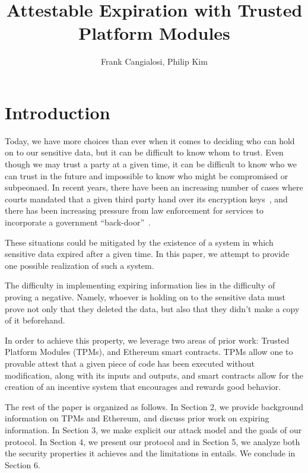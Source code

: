 \documentclass{article}
\begin{document}
\title{Attestable Expiration with Trusted Platform Modules}
\author{Frank Cangialosi, Philip Kim}

\maketitle

\section{Introduction}

Today, we have more choices than ever when it comes to deciding who can hold on to our sensitive data, but it can be difficult to know whom to trust. Even though we may trust a party at a given time, it can be difficult to know who we can trust in the future and impossible to know who might be compromised or subpeonaed. In recent years, there have been an increasing number of cases where courts mandated that a given third party hand over its encryption keys~\cite{hushmail}, and there has been increasing pressure from law enforcement for services to incorporate a government ``back-door''~\cite{backdoor}.

These situations could be mitigated by the existence of a system in which sensitive data expired after a given time. In this paper, we attempt to provide one possible realization of such a system.

The difficulty in implementing expiring information lies in the difficulty of proving a negative. Namely, whoever is holding on to the sensitive data must prove not only that they deleted the data, but also that they didn't make a copy of it beforehand.

In order to achieve this property, we leverage two areas of prior work: Trusted Platform Modules (TPMs), and Ethereum smart contracts. TPMs allow one to provable attest that a given piece of code has been executed without modification, along with its inputs and outputs, and smart contracts allow for the creation of an incentive system that encourages and rewards good behavior.

The rest of the paper is organized as follows. In Section 2, we provide background information on TPMs and Ethereum, and discuss prior work on expiring information. In Section 3, we make explicit our attack model and the goals of our protocol. In Section 4, we present our protocol and in Section 5, we analyze both the security properties it achieves and the limitations in entails. We conclude in Section 6.
\end{document}
